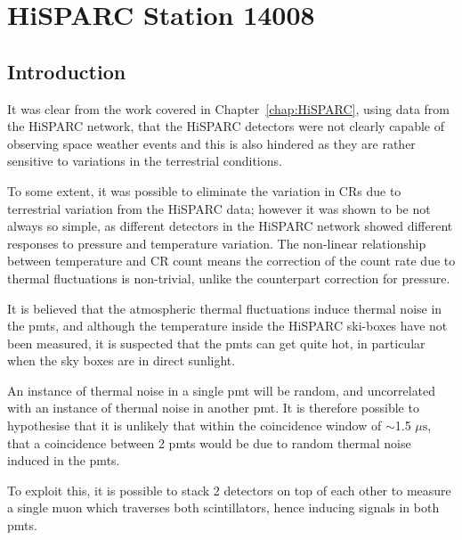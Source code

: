 \chapter{HiSPARC Station 14008}\label{chap:HiSPARC_14008}

\section{Introduction}\label{sec:HS_14008_intro}

It was clear from the work covered in Chapter~\ref{chap:HiSPARC}, using data from the HiSPARC network, that the HiSPARC detectors were not clearly capable of observing space weather events and this is also hindered as they are rather sensitive to variations in the terrestrial conditions. 

To some extent, it was possible to eliminate the variation in CRs due to terrestrial variation from the HiSPARC data; however it was shown to be not always so simple, as different detectors in the HiSPARC network showed different responses to pressure and temperature variation. The non-linear relationship between temperature and CR count means the correction of the count rate due to thermal fluctuations is non-trivial, unlike the counterpart correction for pressure. 

It is believed that the atmospheric thermal fluctuations induce thermal noise in the \glspl{pmt}, and although the temperature inside the HiSPARC ski-boxes have not been measured, it is suspected that the \glspl{pmt} can get quite hot, in particular when the sky boxes are in direct sunlight.

An instance of thermal noise in a single \gls{pmt} will be random, and uncorrelated with an instance of thermal noise in another \gls{pmt}. It is therefore possible to hypothesise that it is unlikely that within the coincidence window of $\sim$1.5 $\mu \mathrm{s}$, that a coincidence between 2 \glspl{pmt} would be due to random thermal noise induced in the \glspl{pmt}.

To exploit this, it is possible to stack 2 detectors on top of each other to measure a single muon which traverses both scintillators, hence inducing signals in both \glspl{pmt}.



